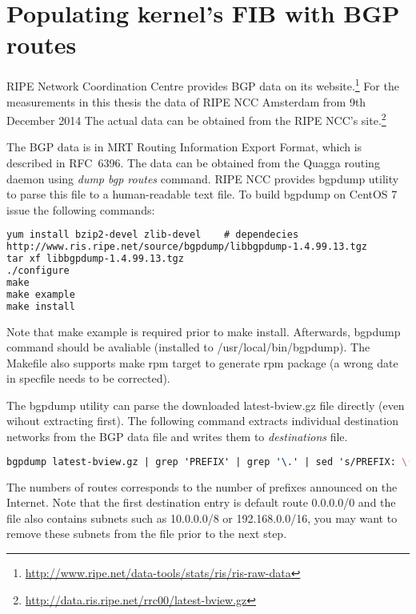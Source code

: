 \chapter{Populating kernel's FIB with BGP routes}
RIPE Network Coordination Centre provides BGP data on its
website.\footnote{{\url{http://www.ripe.net/data-tools/stats/ris/ris-raw-data}}}
For the measurements in this thesis the data of RIPE NCC Amsterdam from 9th December 2014
The actual data can be obtained from the RIPE NCC's
site.\footnote{{\url{http://data.ris.ripe.net/rrc00/latest-bview.gz}}}

The BGP data is in MRT Routing Information Export Format, which is described in RFC~6396.
The data can be obtained from the Quagga routing daemon
using {\it{dump bgp routes}} command.
RIPE NCC provides bgpdump utility to parse this file to a human-readable text file.
To build bgpdump on CentOS 7 issue the following commands:
\begin{lstlisting}[language=TeX]
yum install bzip2-devel zlib-devel    # dependecies
http://www.ris.ripe.net/source/bgpdump/libbgpdump-1.4.99.13.tgz
tar xf libbgpdump-1.4.99.13.tgz
./configure
make
make example
make install
\end{lstlisting}
Note that make example is required prior to make install.
Afterwards, bgpdump command should be avaliable (installed to /usr/local/bin/bgpdump).
The Makefile also supports make rpm target to generate rpm package (a wrong date in specfile needs to be corrected).

The bgpdump utility can parse the downloaded latest-bview.gz file directly (even wihout extracting first).
The following command extracts individual destination networks from the BGP data file and writes them to {\it{destinations}} file.
\begin{lstlisting}[language=TeX]
bgpdump latest-bview.gz | grep 'PREFIX' | grep '\.' | sed 's/PREFIX: \(.*\)/\1/' | uniq > destinations
\end{lstlisting}
The numbers of routes corresponds to the number of prefixes announced on the Internet.
Note that the first destination entry is default route 0.0.0.0/0 and the file also contains subnets such as 10.0.0.0/8 or 192.168.0.0/16,
you may want to remove these subnets from the file prior to the next step.


